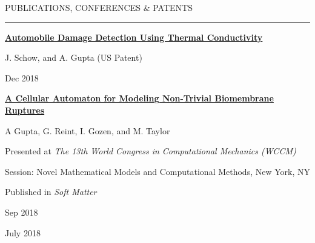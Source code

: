 

\vspace{2ex}
{
\hspace{-1.72in}\noindent\color{cblue}
{PUBLICATIONS, CONFERENCES \& PATENTS} %
}

\vspace{-1.6ex}
{\hspace{-1.73in}\noindent\color{dblue}\rule{6.935in}{0.4pt}} %
\vspace{-2.4ex}

{\hspace{-1.76in}\fontsize{9}{1}
\textbf{\href{https://patents.google.com/patent/US20200202637A1/en}{Automobile Damage Detection Using Thermal Conductivity}    }}

{\hspace{-1.76in}\fontsize{9}{1}
{\small J. Schow, and A. Gupta (US Patent)}
}

\begin{subtitle}
    \vspace{-8.2ex}
    {{Dec 2018}}
\end{subtitle}

\vspace{2ex}

{\hspace{-1.76in}\fontsize{9}{1}
\textbf{\href{https://pubmed.ncbi.nlm.nih.gov/31062781/}{A Cellular Automaton for Modeling Non-Trivial Biomembrane Ruptures}
}}

{\hspace{-1.76in}\fontsize{9}{1} 
{\small A Gupta, G. Reint, I. Gozen, and M. Taylor}}

{\hspace{-1.76in}\fontsize{9}{1}
\small Presented at \textit{The 13th World Congress in Computational Mechanics (WCCM)}
}

{\hspace{-1.76in}\fontsize{9}{1}
\small Session: Novel Mathematical Models and Computational Methods, New York, NY
}

{\hspace{-1.76in}\fontsize{9}{1}
\small Published in \textit{Soft Matter}
}

\begin{subtitle}
    \vspace{-11.2ex}
    {{Sep 2018}}
\end{subtitle}

\begin{subtitle}
    \vspace{-10.2ex}
    {{July 2018}}
\end{subtitle}

\vspace{7ex}